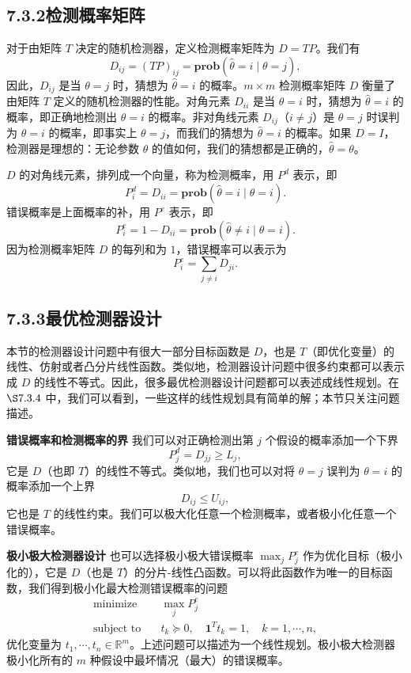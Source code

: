 \documentclass[UTF8, 12pt, fontset=fandol, oneside]{ctexart}
\begin{document}
\subsection*{7.3.2\quad 检测概率矩阵}

对于由矩阵 $T$ 决定的随机检测器，定义检测概率矩阵为 $D=TP$。我们有
\[
D_{ij}=(TP)_{ij}=\mathbf{prob}(\hat{\theta}=i\mid \theta=j),
\]
因此，$D_{ij}$ 是当 $\theta=j$ 时，猜想为 $\hat{\theta}=i$ 的概率。$m\times m$ 检测概率矩阵 $D$ 衡量了由矩阵 $T$ 定义的随机检测器的性能。对角元素 $D_{ii}$ 是当 $\theta=i$ 时，猜想为 $\hat{\theta}=i$ 的概率，即正确地检测出 $\theta=i$ 的概率。非对角线元素 $D_{ij}$（$i\neq j$）是 $\theta=j$ 时误判为 $\theta=i$ 的概率，即事实上 $\theta=j$，而我们的猜想为 $\hat{\theta}=i$ 的概率。如果 $D=I$，检测器是理想的：无论参数 $\theta$ 的值如何，我们的猜想都是正确的，$\hat{\theta}=\theta$。

$D$ 的对角线元素，排列成一个向量，称为检测概率，用 $P^d$ 表示，即
\[
P_i^d=D_{ii}=\mathbf{prob}(\hat{\theta}=i\mid \theta=i).
\]
错误概率是上面概率的补，用 $P^e$ 表示，即
\[
P_i^e=1-D_{ii}=\mathbf{prob}(\hat{\theta}\neq i\mid \theta=i).
\]
因为检测概率矩阵 $D$ 的每列和为 $1$，错误概率可以表示为
\[
P_i^e=\sum_{j\neq i}D_{ji}.
\]

\subsection*{7.3.3\quad 最优检测器设计}

本节的检测器设计问题中有很大一部分目标函数是 $D$，也是 $T$（即优化变量）的线性、仿射或者凸分片线性函数。类似地，检测器设计问题中很多约束都可以表示成 $D$ 的线性不等式。因此，很多最优检测器设计问题都可以表述成线性规划。在 $\S 7.3.4$ 中，我们可以看到，一些这样的线性规划具有简单的解；本节只关注问题描述。

\noindent\textbf{错误概率和检测概率的界}\quad
我们可以对正确检测出第 $j$ 个假设的概率添加一个下界
\[
P_j^d=D_{jj}\geq L_j,
\]
它是 $D$（也即 $T$）的线性不等式。类似地，我们也可以对将 $\theta=j$ 误判为 $\theta=i$ 的概率添加一个上界
\[
D_{ij}\leq U_{ij},
\]
它也是 $T$ 的线性约束。我们可以极大化任意一个检测概率，或者极小化任意一个错误概率。

\noindent\textbf{极小极大检测器设计}\quad
也可以选择极小极大错误概率 $\max_j P_j^e$ 作为优化目标（极小化的），它是 $D$（也是 $T$）的分片-线性凸函数。可以将此函数作为唯一的目标函数，我们得到极小化最大检测错误概率的问题
\[
\begin{aligned}
\text{minimize}\quad & \max_j P_j^e\\
\text{subject to}\quad & t_k\succeq 0,\quad \mathbf{1}^Tt_k=1,\quad k=1,\cdots,n,
\end{aligned}
\]
优化变量为 $t_1,\cdots,t_n\in\mathbb{R}^m$。上述问题可以描述为一个线性规划。极小极大检测器极小化所有的 $m$ 种假设中最坏情况（最大）的错误概率。
\end{document}
